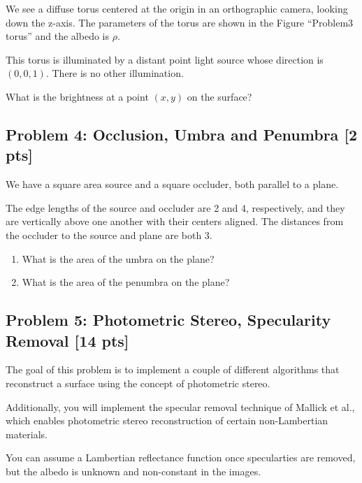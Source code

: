 \documentclass[11pt]{article}
\begin{document}
We see a diffuse torus centered at the origin in an orthographic camera,
looking down the z-axis. The parameters of the torus are shown in the
Figure ``Problem3 torus'' and the albedo is \(\rho\).

This torus is illuminated by a distant point light source whose
direction is \((0,0,1)\). There is no other illumination.

What is the brightness at a point \((x, y)\) on the surface?

    \hypertarget{problem-4-occlusion-umbra-and-penumbra-2-pts}{%
\subsection{Problem 4: Occlusion, Umbra and Penumbra {[}2
pts{]}}\label{problem-4-occlusion-umbra-and-penumbra-2-pts}}

We have a square area source and a square occluder, both parallel to a
plane.

The edge lengths of the source and occluder are 2 and 4, respectively,
and they are vertically above one another with their centers aligned.
The distances from the occluder to the source and plane are both 3.

\begin{enumerate}
\def\labelenumi{\arabic{enumi}.}
\item
  What is the area of the umbra on the plane?
\item
  What is the area of the penumbra on the plane?
\end{enumerate}

    \hypertarget{problem-5-photometric-stereo-specularity-removal-14-pts}{%
\subsection{Problem 5: Photometric Stereo, Specularity Removal {[}14
pts{]}}\label{problem-5-photometric-stereo-specularity-removal-14-pts}}

The goal of this problem is to implement a couple of different
algorithms that reconstruct a surface using the concept of photometric
stereo.

Additionally, you will implement the specular removal technique of
Mallick et al., which enables photometric stereo reconstruction of
certain non-Lambertian materials.

You can assume a Lambertian reflectance function once specularties are
removed, but the albedo is unknown and non-constant in the images.
\end{document}
